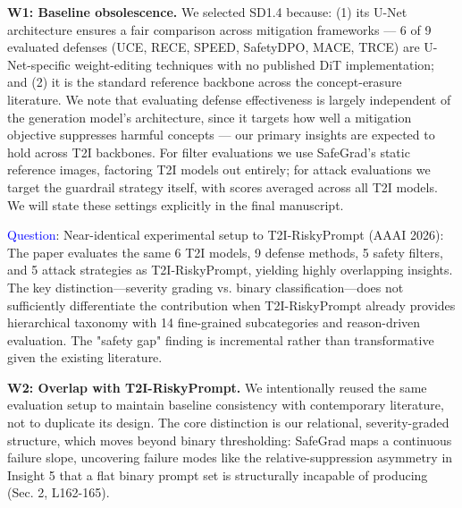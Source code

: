 \textbf{W1: Baseline obsolescence.} We selected SD1.4 because: (1) its U-Net architecture ensures a fair comparison across mitigation frameworks — 6 of 9 evaluated defenses (UCE, RECE, SPEED, SafetyDPO, MACE, TRCE) are U-Net-specific weight-editing techniques with no published DiT implementation; and (2) it is the standard reference backbone across the concept-erasure literature. We note that evaluating defense effectiveness is largely independent of the generation model's architecture, since it targets how well a mitigation objective suppresses harmful concepts — our primary insights are expected to hold across T2I backbones. For filter evaluations we use SafeGrad's static reference images, factoring T2I models out entirely; for attack evaluations we target the guardrail strategy itself, with scores averaged across all T2I models. We will state these settings explicitly in the final manuscript.


\textcolor{blue}{Question}: Near-identical experimental setup to T2I-RiskyPrompt (AAAI 2026): The paper evaluates the same 6 T2I models, 9 defense methods, 5 safety filters, and 5 attack strategies as T2I-RiskyPrompt, yielding highly overlapping insights. The key distinction—severity grading vs. binary classification—does not sufficiently differentiate the contribution when T2I-RiskyPrompt already provides hierarchical taxonomy with 14 fine-grained subcategories and reason-driven evaluation. The "safety gap" finding is incremental rather than transformative given the existing literature.


\textbf{W2: Overlap with T2I-RiskyPrompt.} We intentionally reused the same evaluation setup to maintain baseline consistency with contemporary literature, not to duplicate its design. The core distinction is our relational, severity-graded structure, which moves beyond binary thresholding: SafeGrad maps a continuous failure slope, uncovering failure modes like the relative-suppression asymmetry in Insight 5 that a flat binary prompt set is structurally incapable of producing (Sec. 2, L162-165).





